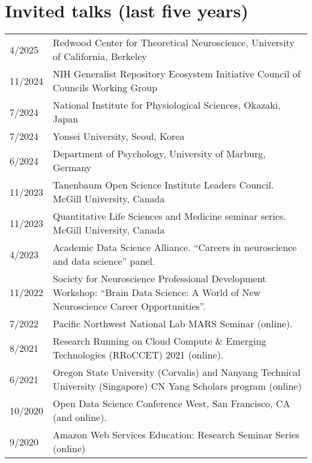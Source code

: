 \documentclass[11pt,fullpage]{article}
\begin{document}
\section*{Invited talks (last five years)}
  \begin{tabular}{p{}p{}}
  4/2025 & Redwood Center for Theoretical Neuroscience, University of California, Berkeley \\
  11/2024 & NIH Generalist Repository Ecosystem Initiative Council of Councils Working Group \\
  7/2024 & National Institute for Physiological Sciences, Okazaki, Japan \\
  7/2024 & Yonsei University, Seoul, Korea \\
  6/2024 & Department of Psychology, University of Marburg, Germany \\
  11/2023 & Tanenbaum Open Science Institute Leaders Council. McGill University, Canada \\
  11/2023 & Quantitative Life Sciences and Medicine seminar series. McGill University, Canada \\
  4/2023 & Academic Data Science Alliance. ``Careers in neuroscience and data science'' panel. \\
  11/2022 & Society for Neuroscience Professional Development Workshop: ``Brain Data Science: A World of New Neuroscience Career Opportunities''.\\
  7/2022 & Pacific Northwest National Lab MARS Seminar (online).\\
  8/2021 & Research Running on Cloud Compute \& Emerging Technologies (RRoCCET) 2021 (online). \\
  6/2021 & Oregon State University (Corvalis) and Nanyang Technical University (Singapore) CN Yang Scholars program (online) \\
  10/2020 & Open Data Science Conference West, San Francisco, CA (and online). \\
  9/2020 & Amazon Web Services Education: Research Seminar Series (online) \\
  \end{tabular}
\end{document}
